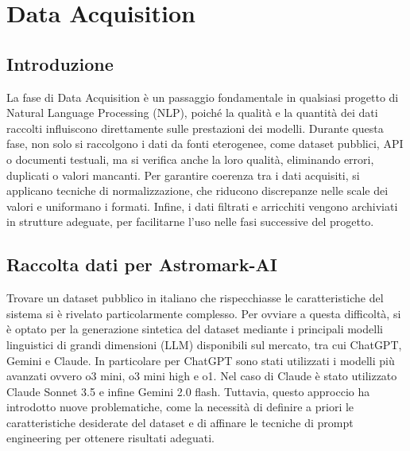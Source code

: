 
\chapter{Data Acquisition}


\section{Introduzione}
La fase di Data Acquisition è un passaggio fondamentale in qualsiasi progetto di Natural Language Processing (NLP), poiché la qualità e la quantità dei dati raccolti influiscono direttamente sulle prestazioni dei modelli. Durante questa fase, non solo si raccolgono i dati da fonti eterogenee, come dataset pubblici, API o documenti testuali, ma si verifica anche la loro qualità, eliminando errori, duplicati o valori mancanti. Per garantire coerenza tra i dati acquisiti, si applicano tecniche di normalizzazione, che riducono discrepanze nelle scale dei valori e uniformano i formati. Infine, i dati filtrati e arricchiti vengono archiviati in strutture adeguate, per facilitarne l’uso nelle fasi successive del progetto.

\section{Raccolta dati per Astromark-AI}
Trovare un dataset pubblico in italiano che rispecchiasse le caratteristiche del sistema si è rivelato particolarmente complesso. Per ovviare a questa difficoltà, si è optato per la generazione sintetica del dataset mediante i principali modelli linguistici di grandi dimensioni (LLM) disponibili sul mercato, tra cui ChatGPT, Gemini e Claude. In particolare per ChatGPT sono stati utilizzati i modelli più avanzati ovvero o3 mini, o3 mini high e o1. Nel caso di Claude è stato utilizzato Claude Sonnet 3.5 e infine Gemini 2.0 flash. Tuttavia, questo approccio ha introdotto nuove problematiche, come la necessità di definire a priori le caratteristiche desiderate del dataset e di affinare le tecniche di prompt engineering per ottenere risultati adeguati.

